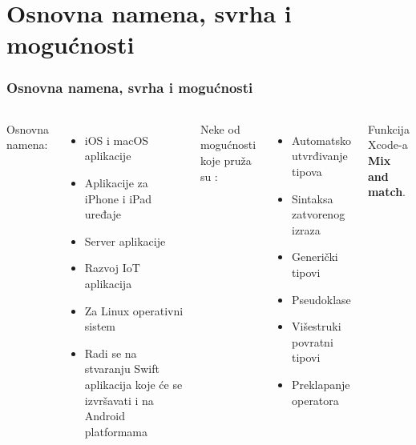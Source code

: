 \documentclass{beamer}
\begin{document}
\section{Osnovna namena, svrha i mogućnosti}
\begin{frame}
\frametitle{Osnovna namena, svrha i mogućnosti}

\begin{columns}[t]
Osnovna namena:
\begin{itemize}
\item iOS i macOS aplikacije
\item Aplikacije za iPhone i iPad uređaje
\item Server aplikacije
\item Razvoj IoT aplikacija
\item Za Linux operativni sistem
\item Radi se na
stvaranju Swift aplikacija koje će se izvršavati i na Android platformama
\end{itemize}

Neke od mogućnosti koje pruža su \cite{mastering_swift3}:
\begin{itemize}
\item{Automatsko utvrđivanje tipova}
\item{Sintaksa zatvorenog izraza}
\item{Generički tipovi}
\item{Pseudoklase}
\item{Višestruki povratni tipovi}
\item{Preklapanje operatora}
\end{itemize}
Funkcija Xcode-a \textbf{Mix and match}.

\end{columns}
\end{frame}
\end{document}
